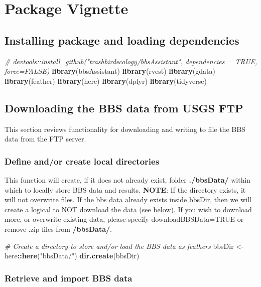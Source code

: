 \documentclass[12pt,twoside,openany]{reedthesis}
\newenvironment{Shaded}{\begin{snugshade}}{\end{snugshade}}
\newcommand{\CommentTok}[1]{\textcolor[rgb]{0.56,0.35,0.01}{\textit{#1}}}
\newcommand{\KeywordTok}[1]{\textcolor[rgb]{0.13,0.29,0.53}{\textbf{#1}}}
\newcommand{\NormalTok}[1]{#1}
\newcommand{\OperatorTok}[1]{\textcolor[rgb]{0.81,0.36,0.00}{\textbf{#1}}}
\newcommand{\StringTok}[1]{\textcolor[rgb]{0.31,0.60,0.02}{#1}}
\begin{document}
\hypertarget{package-vignette}{%
\section{Package Vignette}\label{package-vignette}}

\hypertarget{installing-package-and-loading-dependencies}{%
\subsection{Installing package and loading dependencies}\label{installing-package-and-loading-dependencies}}
\begin{Shaded}
\begin{Highlighting}[]
\CommentTok{# devtools::install_github("trashbirdecology/bbsAssistant", dependencies = TRUE, force=FALSE)}
\KeywordTok{library}\NormalTok{(bbsAssistant)}
\KeywordTok{library}\NormalTok{(rvest)}
\KeywordTok{library}\NormalTok{(gdata)}
\KeywordTok{library}\NormalTok{(feather)}
\KeywordTok{library}\NormalTok{(here)}
\KeywordTok{library}\NormalTok{(dplyr)}
\KeywordTok{library}\NormalTok{(tidyverse)}
\end{Highlighting}
\end{Shaded}
\hypertarget{downloading-the-bbs-data-from-usgs-ftp}{%
\subsection{Downloading the BBS data from USGS FTP}\label{downloading-the-bbs-data-from-usgs-ftp}}

This section reviews functionality for downloading and writing to file the BBS data from the FTP server.

\hypertarget{define-andor-create-local-directories}{%
\subsubsection{Define and/or create local directories}\label{define-andor-create-local-directories}}

This function will create, if it does not already exist, folder \textbf{./bbsData/} within which to locally store BBS data and results.
\textbf{NOTE}: If the directory exists, it will not overwrite files. If the bbs data already exists inside bbsDir, then we will create a logical to NOT download the data (see below). If you wish to download more, or overwrite existing data, please specify downloadBBSData=TRUE or remove .zip files from \textbf{/bbsData/}.
\begin{Shaded}
\begin{Highlighting}[]
\CommentTok{# Create a directory to store and/or load the BBS data as feathers}
\NormalTok{bbsDir <-}\StringTok{ }\NormalTok{here}\OperatorTok{::}\KeywordTok{here}\NormalTok{(}\StringTok{"bbsData/"}\NormalTok{)}
\KeywordTok{dir.create}\NormalTok{(bbsDir)}
\end{Highlighting}
\end{Shaded}
\hypertarget{retrieve-and-import-bbs-data}{%
\subsubsection{Retrieve and import BBS data}\label{retrieve-and-import-bbs-data}}
\end{document}
